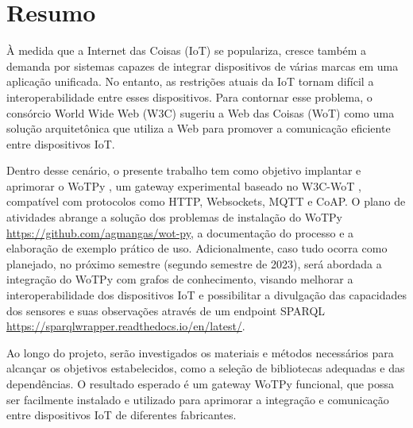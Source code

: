 \chapter{Resumo}


À medida que a Internet das Coisas (IoT) se populariza, cresce também a demanda por sistemas capazes de integrar dispositivos de várias marcas em uma aplicação unificada. No entanto, as restrições atuais da IoT tornam difícil a interoperabilidade entre esses dispositivos. Para contornar esse problema, o consórcio World Wide Web (W3C) \cite{W3CAbout} sugeriu a Web das Coisas (WoT) \cite{WoTCommunityWiki} como uma solução arquitetônica que utiliza a Web para promover a comunicação eficiente entre dispositivos IoT.

Dentro desse cenário, o presente trabalho tem como objetivo implantar e aprimorar o WoTPy \cite{GARCIAMANGAS2019235}, um gateway experimental baseado no W3C-WoT \cite{WoTArchitecture}, compatível com protocolos como HTTP, Websockets, MQTT e CoAP. O plano de atividades abrange a solução dos problemas de instalação do WoTPy \url{https://github.com/agmangas/wot-py}, a documentação do processo e a elaboração de exemplo prático de uso. Adicionalmente, caso tudo ocorra como planejado, no próximo semestre (segundo semestre de 2023), será abordada a integração do WoTPy com grafos de conhecimento, visando melhorar a interoperabilidade dos dispositivos IoT e possibilitar a divulgação das capacidades dos sensores e suas observações através de um endpoint SPARQL \url{https://sparqlwrapper.readthedocs.io/en/latest/}.

Ao longo do projeto, serão investigados os materiais e métodos necessários para alcançar os objetivos estabelecidos, como a seleção de bibliotecas adequadas e das dependências. O resultado esperado é um gateway WoTPy funcional, que possa ser facilmente instalado e utilizado para aprimorar a integração e comunicação entre dispositivos IoT de diferentes fabricantes.

